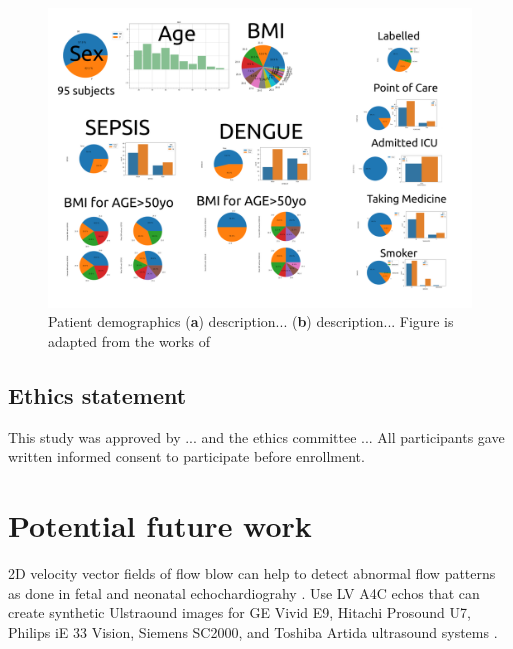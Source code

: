 \begin{figure}[h]
\includegraphics[width=\columnwidth]{../figures/patient-demographics-and-diseases/versions/drawing-v00}
\caption{
	Patient demographics
	(\textbf{a}) description...
	(\textbf{b}) description...
	Figure is adapted from the works of %
}
\end{figure}


\subsection{Ethics statement}
This study was approved by ... and the ethics committee ...
All participants gave written informed consent to participate before enrollment.

\section{Potential future work}
2D velocity vector fields of flow blow can help to detect abnormal flow patterns as done in fetal and neonatal echochardiograhy \cite{Meyers2020}.
Use LV A4C echos that can create synthetic Ulstraound images for GE Vivid E9, Hitachi Prosound U7, Philips iE 33 Vision, Siemens SC2000, and Toshiba Artida ultrasound systems \cite{brindise2020unsupervised}. 
